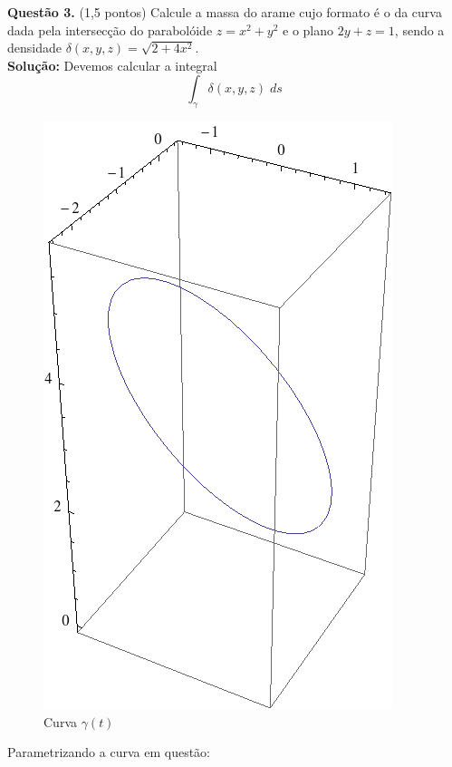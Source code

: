\documentclass[12pt,a4paper]{article}
\begin{document}
\newpage


\textbf{Quest\~{a}o 3.} (1,5 pontos) Calcule a massa do arame cujo formato é o da curva dada 	pela intersecção do parabolóide  $z = x^2 + y^2$ e o plano $2y + z = 1$, sendo a densidade $\delta(x,y,z) = \sqrt{2+4x^2}$. \\

\textbf{Solução:}
\linebreak
Devemos calcular a integral
\begin{equation}
 \int_{\gamma}{\delta(x,y,z)}\;ds \
\label{eq:integral}
\end{equation}

\begin{figure}[h!]
	\centering
	\includegraphics[scale=0.3]{Fig3.png}  
	\caption{Curva $\gamma(t)$}
	\label{fig:figura3}
\end{figure}

Parametrizando a curva em questão:
\end{document}
